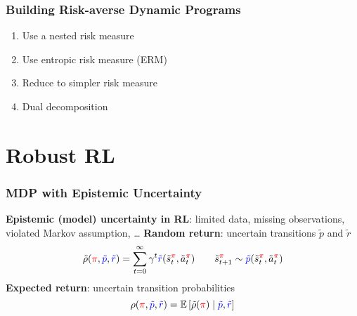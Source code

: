 \documentclass{beamer}
\newcommand{\tc}[2]{\textcolor{#1}{#2}}
\newcommand{\tcb}[1]{\tc{blue}{#1}}
\newcommand{\tcr}[1]{\tc{red}{#1}}
\newcommand{\E}{\mathbb{E}}
\newcommand{\Ex}[1]{\E \left[#1 \right]}
\newcommand{\risko}{\operatorname{Risk}}
\newcommand{\risk}[1]{\risko\left[#1\right]}
\begin{document}
\begin{frame} \frametitle{Building Risk-averse Dynamic Programs}
  \begin{enumerate}
  \item Use a nested risk measure
    \vfill 
  \item Use entropic risk measure (ERM)
    \vfill
  \item Reduce to simpler risk measure
    \vfill 
  \item Dual decomposition
  \end{enumerate}
\end{frame}



\section{Robust RL}


\begin{frame} \frametitle{MDP with Epistemic Uncertainty}
    \textbf{Epistemic (model) uncertainty in RL}: limited data, missing observations, violated Markov assumption, \ldots
    \vfill 
    \textbf{Random return}: uncertain transitions $\tilde{p}$ and $\tilde{r}$
    \[
      \tilde{\rho}(\tcr{\pi}, \tcb{\tilde{p}}, \tcb{\tilde{r}}) = \sum_{t=0}^\infty \gamma^t \tcb{\tilde{r}}(\tilde{s}^{\tcr{\pi}}_t, \tilde{a}^{\tcr{\pi}}_t) \qquad \tilde{s}_{t+1}^{\tcr{\pi}} \sim \tcb{\tilde{p}}(\tilde{s}_t^{\tcr{\pi}},\tilde{a}_t^{\tcr{\pi}})
    \]
    \vfill
    \textbf{Expected return}: uncertain transition probabilities 
    \[
        \rho(\tcr\pi, \tcb{\tilde{p}}, \tcb{ \tilde{r} }) = \Ex{\tilde{\rho}(\tcr\pi) \mid \tcb{ \tilde{p} }, \tcb{ \tilde{r} }}
    \]  
\end{frame}
\end{document}
